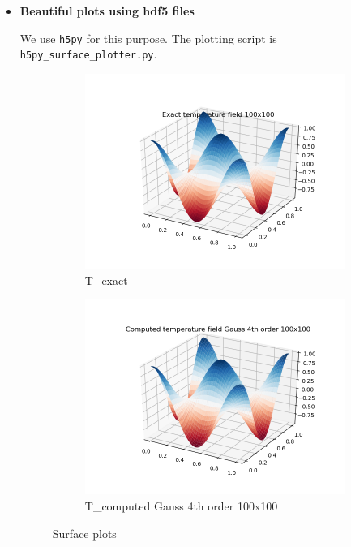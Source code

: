 \documentclass[12 pt, final]{article}
\begin{document}
\begin{itemize}
\item \textbf{Beautiful plots using hdf5 files}

We use \texttt{h5py} for this purpose. The plotting script is \texttt{h5py\_surface\_plotter.py}.

          \begin{figure}[H]
        \centering
        \begin{subfigure}{.5\textwidth}
          \centering
          \includegraphics[width=.99\linewidth]{figures/hdf5_surface_exact_plot.png}
          \caption{T\_exact}
          \label{fig:sub1}
        \end{subfigure}%
        \begin{subfigure}{.5\textwidth}
          \centering
          \includegraphics[width=.99\linewidth]{figures/hdf5_surface_computed_plot.png}
          \caption{T\_computed Gauss 4th order 100x100}
          \label{fig:sub2}
        \end{subfigure}
        \caption{Surface plots}
        \label{fig:test}
        \end{figure}
        

\end{itemize}
\end{document}
